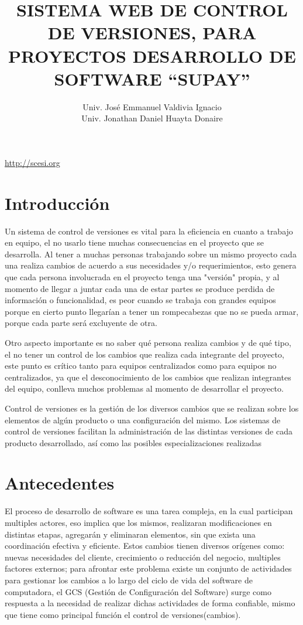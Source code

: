 \documentclass[letterpaper,11pt]{article}
\title{\bf SISTEMA WEB DE  CONTROL DE VERSIONES, PARA PROYECTOS DESARROLLO DE SOFTWARE “SUPAY”}
\author{
    Univ. José Emmanuel Valdivia Ignacio \\
    Univ. Jonathan Daniel Huayta Donaire \\
}
\begin{document}
\maketitle
\begin{center}\url {http://scesi.org}\end{center}
\pagebreak

\tableofcontents
\pagebreak

\section{Introducción}
Un sistema de control de versiones es vital para la eficiencia en cuanto a trabajo en equipo, el no usarlo tiene muchas consecuencias en el proyecto que se desarrolla. Al tener a muchas personas trabajando sobre un mismo proyecto cada una realiza cambios de acuerdo a sus necesidades y/o requerimientos, esto genera que cada persona involucrada en el proyecto tenga una "versión" propia, y al momento de llegar a juntar cada una de estar partes se produce perdida de información o funcionalidad, es peor cuando se trabaja con grandes equipos porque en cierto punto llegarían a tener un rompecabezas que no se pueda armar, porque cada parte será excluyente de otra.

Otro aspecto importante es no saber qué persona realiza cambios y de qué tipo, el no tener un control de los cambios que realiza cada integrante del proyecto, este punto es crítico tanto para equipos centralizados como para equipos no centralizados, ya que el desconocimiento de los cambios que realizan integrantes del equipo, conlleva muchos problemas al momento de desarrollar el proyecto. 

Control  de versiones es la gestión de los diversos cambios que se realizan sobre los elementos de algún producto o una configuración del mismo. Los sistemas de control de versiones facilitan la administración de las distintas versiones de cada producto desarrollado, así como las posibles especializaciones realizadas
\section{Antecedentes}
El proceso de desarrollo de software es una tarea compleja, en la cual participan multiples actores, eso implica que los mismos, realizaran modificaciones en distintas etapas, agregarán y eliminaran elementos, sin que exista una coordinación efectiva y eficiente. Estos cambios tienen diversos orígenes como: nuevas necesidades del cliente, crecimiento o reducción del negocio, multiples factores externos; para afrontar este problema existe un conjunto de actividades para gestionar los cambios a lo largo del ciclo de vida del software de computadora, el GCS (Gestión de Configuración del Software) surge como respuesta a la necesidad de realizar dichas actividades de forma confiable, mismo que tiene como principal función el control de versiones(cambios).
\end{document}
